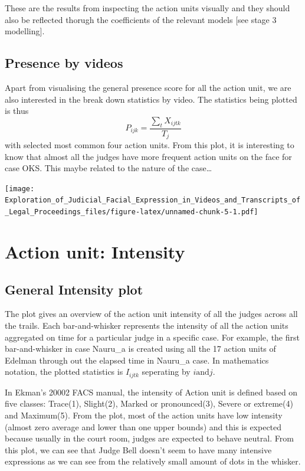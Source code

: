 \documentclass{monashthesis}
\begin{document}
These are the results from inspecting the action units visually and they should also be reflected thorugh the coefficients of the relevant models {[}see stage 3 modelling{]}.

\hypertarget{presence-by-videos}{%
\subsection{Presence by videos}\label{presence-by-videos}}

Apart from visualising the general presence score for all the action unit, we are also interested in the break down statistics by video. The statistics being plotted is thus \[P_{ijk} = \frac{\sum_{t}X_{ijtk}}{T_j}\] with selected most common four action units. From this plot, it is interesting to know that almost all the judges have more frequent action units on the face for case OKS. This maybe related to the nature of the case\ldots{}

\texttt{[image: Exploration\_of\_Judicial\_Facial\_Expression\_in\_Videos\_and\_Transcripts\_of\_Legal\_Proceedings\_files/figure-latex/unnamed-chunk-5-1.pdf]}

\hypertarget{action-unit-intensity}{%
\section{Action unit: Intensity}\label{action-unit-intensity}}

\hypertarget{general-intensity-plot}{%
\subsection{General Intensity plot}\label{general-intensity-plot}}

The plot gives an overview of the action unit intensity of all the judges across all the trails. Each bar-and-whisker represents the intensity of all the action units aggregated on time for a particular judge in a specific case. For example, the first bar-and-whisker in case Nauru\_a is created using all the 17 action units of Edelman through out the elapsed time in Nauru\_a case. In mathematics notation, the plotted statistics is \(I_{ijtk}\) seperating by \(i \text{and} j\).

In Ekman's 20002 FACS manual, the intensity of Action unit is defined based on five classes: Trace(1), Slight(2), Marked or pronounced(3), Severe or extreme(4) and Maximum(5). From the plot, most of the action units have low intensity (almost zero average and lower than one upper bounds) and this is expected because usually in the court room, judges are expected to behave neutral. From this plot, we can see that Judge Bell doesn't seem to have many intensive expressions as we can see from the relatively small amount of dots in the whisker.
\end{document}
